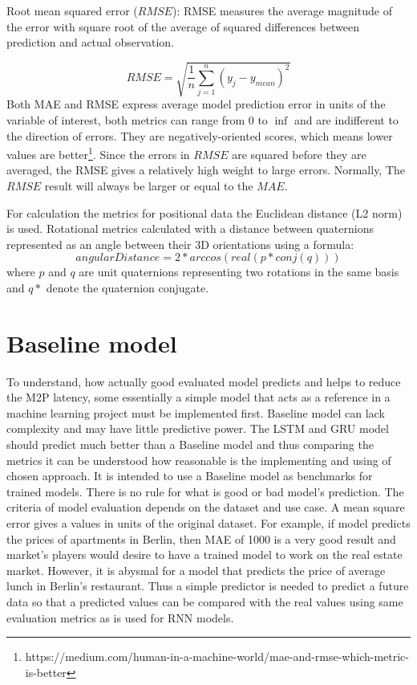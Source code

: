 Root mean squared error ($RMSE$): RMSE measures the average magnitude of the error with square root of the average of squared differences between prediction and actual observation.

\begin{equation}
RMSE= \sqrt{ \frac{1}{n} \sum_{j=1}^{n} (y_j - y_{mean})^2}
\end{equation}
Both MAE and RMSE express average model prediction error in units of the variable of interest, both metrics can range from $0$ to $\inf$ and are indifferent to the direction of errors. They are negatively-oriented scores, which means lower values are better\footnote{https://medium.com/human-in-a-machine-world/mae-and-rmse-which-metric-is-better}. Since the errors in $RMSE$ are squared before they are averaged, the RMSE gives a relatively high weight to large errors. Normally, The $RMSE$ result will always be larger or equal to the $MAE$. 

For calculation the metrics for positional data the Euclidean distance (L2 norm) is used.  Rotational metrics calculated with a distance between quaternions represented as an angle between their 3D orientations using a formula:
\begin{equation}
angularDistance = 2*arccos(real(p*conj(q)))
\end{equation}
where $p$ and $q$ are unit quaternions representing two rotations in the same basis and $q*$ denote the quaternion conjugate.

\section{Baseline model}
\label{sec:eval:baseline}
To understand, how actually good evaluated model predicts and helps to reduce the M2P latency, some essentially a simple model that acts as a reference in a machine learning project must be implemented first. Baseline model can lack complexity and may have little predictive power. The LSTM and GRU model should predict much better than a Baseline model and thus comparing the metrics it can be understood how reasonable is the implementing and using of chosen approach. It is intended to use a Baseline model as benchmarks for trained models. There is no rule for what is good or bad model's prediction. The criteria of model evaluation depends on the dataset and use case. A mean square error gives a values in units of the original dataset. For example, if model predicts the prices of apartments in Berlin, then MAE of 1000 is a very good result and market's players would desire to have a trained model to work on the real estate market. However, it is abysmal for a model that predicts the price of average lunch in Berlin's restaurant. Thus a simple predictor is needed to predict a future data so that a predicted values can be compared with the real values using same evaluation metrics as is used for RNN models.

